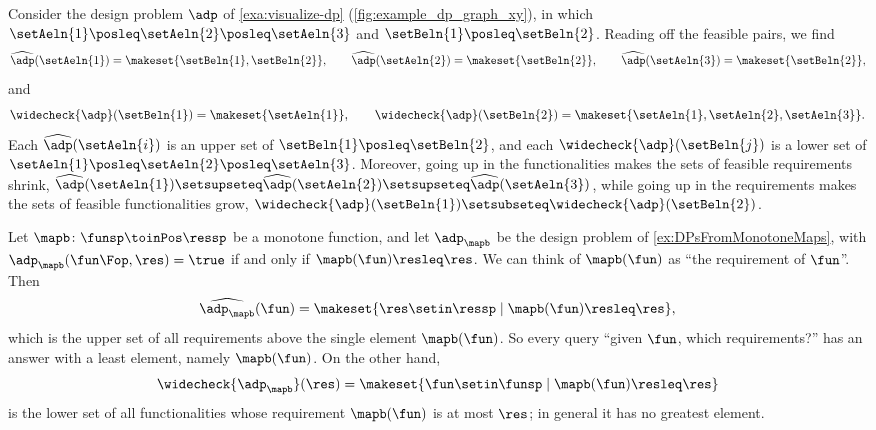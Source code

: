 \begin{example}
    \label{exa:finite-dp-queries}
    Consider the design problem $\adp$ of \cref{exa:visualize-dp} (\cref{fig:example_dp_graph_xy}), in which $\setAeln{1} \posleq \setAeln{2} \posleq \setAeln{3}$ and $\setBeln{1} \posleq \setBeln{2}$.
    Reading off the feasible pairs, we find
    \begin{equation}
        \widehat{\adp}(\setAeln{1}) = \makeset{\setBeln{1}, \setBeln{2}},
        \qquad
        \widehat{\adp}(\setAeln{2}) = \makeset{\setBeln{2}},
        \qquad
        \widehat{\adp}(\setAeln{3}) = \makeset{\setBeln{2}},
    \end{equation}
    and
    \begin{equation}
        \widecheck{\adp}(\setBeln{1}) = \makeset{\setAeln{1}},
        \qquad
        \widecheck{\adp}(\setBeln{2}) = \makeset{\setAeln{1}, \setAeln{2}, \setAeln{3}}.
    \end{equation}
    Each $\widehat{\adp}(\setAeln{i})$ is an upper set of $\setBeln{1} \posleq \setBeln{2}$, and each $\widecheck{\adp}(\setBeln{j})$ is a lower set of $\setAeln{1} \posleq \setAeln{2} \posleq \setAeln{3}$.
    Moreover, going up in the functionalities makes the sets of feasible requirements shrink, $\widehat{\adp}(\setAeln{1}) \setsupseteq \widehat{\adp}(\setAeln{2}) \setsupseteq \widehat{\adp}(\setAeln{3})$, while going up in the requirements makes the sets of feasible functionalities grow, $\widecheck{\adp}(\setBeln{1}) \setsubseteq \widecheck{\adp}(\setBeln{2})$.
\end{example}

\begin{example}
    \label{exa:companion-dp-queries}
    Let $\mapb \colon \funsp \toinPos \ressp$ be a monotone function, and let $\adp_\mapb$ be the design problem of \cref{ex:DPsFromMonotoneMaps}, with $\adp_\mapb(\fun\Fop, \res) = \true$ if and only if $\mapb(\fun) \resleq \res$.
    We can think of $\mapb(\fun)$ as ``the requirement of $\fun$''.
    Then
    \begin{equation}
        \widehat{\adp_\mapb}(\fun) = \makeset{\res \setin \ressp \mid \mapb(\fun) \resleq \res},
    \end{equation}
    which is the upper set of all requirements above the single element $\mapb(\fun)$.
    So every query ``given $\fun$, which requirements?'' has an answer with a least element, namely $\mapb(\fun)$.
    On the other hand,
    \begin{equation}
        \widecheck{\adp_\mapb}(\res) = \makeset{\fun \setin \funsp \mid \mapb(\fun) \resleq \res}
    \end{equation}
    is the lower set of all functionalities whose requirement $\mapb(\fun)$ is at most $\res$; in general it has no greatest element.
\end{example}

